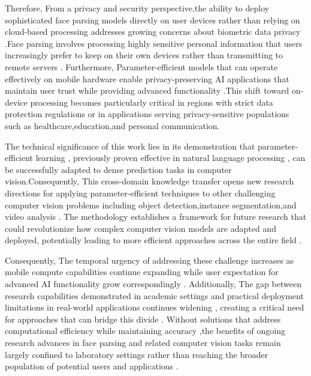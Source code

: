 \documentclass[12pt,a4paper]{report}
\begin{document}
Therefore, From a privacy and security perspective,the ability to deploy sophisticated face parsing models directly on user devices rather than relying on cloud-based processing addresses growing concerns about biometric data privacy \cite{gdpr2016regulation}.Face parsing involves processing highly sensitive personal information that users increasingly prefer to keep on their own devices rather than transmitting to remote servers \cite{voigt2017eu}. Furthermore, Parameter-efficient models that can operate effectively on mobile hardware enable privacy-preserving AI applications that maintain user trust while providing advanced functionality \cite{li2020federated}.This shift toward on-device processing becomes particularly critical in regions with strict data protection regulations or in applications serving privacy-sensitive populations such as healthcare,education,and personal communication.

The technical significance of this work lies in its demonstration that parameter-efficient learning , previously proven effective in natural language processing \cite{hu2021lora}, can be successfully adapted to dense prediction tasks in computer vision.Consequently, This cross-domain knowledge transfer opens new research directions for applying parameter-efficient techniques to other challenging computer vision problems including object detection,instance segmentation,and video analysis \cite{he2017mask}. The methodology establishes a framework for future research that could revolutionize how complex computer vision models are adapted and deployed, potentially leading to more efficient approaches across the entire field \cite{chen2020simple}.

Consequently, The temporal urgency of addressing these challenge increases as mobile compute capabilities continue expanding while user expectation for advanced AI functionality grow correspondingly \cite{howard2017mobilenets}. Additionally, The gap between research capabilities demonstrated in academic settings and practical deployment limitations in real-world applications continues widening , creating a critical need for approaches that can bridge this divide \cite{russakovsky2015imagenet}. Without solutions that address computational efficiency while maintaining accuracy ,the benefits of ongoing research advances in face parsing and related computer vision tasks remain largely confined to laboratory settings rather than reaching the broader population of potential users and applications \cite{deng2009imagenet}.
\end{document}
